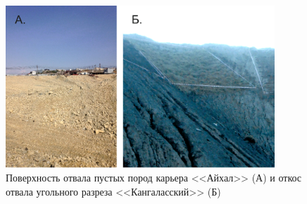 \begin{figure}
  \begin{center}
    \includegraphics[width=0.9\textwidth]{authors/nekiforov-fig1.jpg}
  \end{center}
  \caption{Поверхность отвала пустых пород карьера <<Айхал>> (А) и откос отвала угольного разреза <<Кангаласский>> (Б)}
  \label{fig:nekiforov-fig1}
\end{figure}
